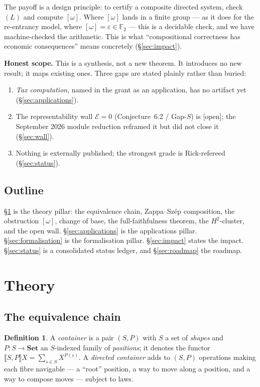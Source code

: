 \documentclass[11pt]{article}
\theoremstyle{plain}
\theoremstyle{definition}
\newtheorem{definition}[theorem]{Definition}
\theoremstyle{remark}
\newcommand{\Set}{\mathbf{Set}}
\newcommand{\omegacl}{[\omega]}
\newcommand{\HH}[1]{H^{#1}}
\newcommand{\grade}[1]{{\small\textsf{[#1]}}}
\newcommand{\gOpen}{\grade{open}}
\begin{document}
The payoff is a design principle: to certify a composite directed system, check $(L)$ and
compute $\omegacl$. Where $\omegacl$ lands in a finite group --- as it does for the
re-entrancy model, where $\omegacl = \varepsilon \in \mathbb{F}_2$ --- this is a decidable
check, and we have machine-checked the arithmetic. This is what ``compositional
correctness has economic consequences'' means concretely (\S\ref{sec:impact}).

\medskip
\noindent\textbf{Honest scope.} This is a synthesis, not a new theorem. It introduces no
new result; it maps existing ones. Three gaps are stated plainly rather than buried:
\begin{enumerate}[nosep,label=(\roman*)]
  \item \emph{Tax computation}, named in the grant as an application, has no artifact yet
    (\S\ref{sec:applications}).
  \item The representability wall $\mathcal{E}=0$ (Conjecture~6.2 / Gap-$S$) is
    \gOpen{}; the September 2026 module reduction reframed it but did not close it
    (\S\ref{sec:wall}).
  \item Nothing is externally published; the strongest grade is Rick-refereed
    (\S\ref{sec:status}).
\end{enumerate}

\subsection{Outline}
\S\ref{sec:theory} is the theory pillar: the equivalence chain, Zappa--Sz\'ep
composition, the obstruction $\omegacl$, change of base, the full-faithfulness theorem,
the $\HH{2}$-cluster, and the open wall. \S\ref{sec:applications} is the applications
pillar. \S\ref{sec:formalisation} is the formalisation pillar. \S\ref{sec:impact} states
the impact. \S\ref{sec:status} is a consolidated status ledger, and \S\ref{sec:roadmap}
the roadmap.

\section{Theory}\label{sec:theory}

\subsection{The equivalence chain}\label{sec:chain}

\begin{definition}
A \emph{container} is a pair $(S, P)$ with $S$ a set of \emph{shapes} and
$P \colon S \to \Set$ an $S$-indexed family of \emph{positions}; it denotes the functor
$\llbracket S,P\rrbracket X = \sum_{s\in S} X^{P(s)}$. A \emph{directed container} adds
to $(S,P)$ operations making each fibre navigable --- a ``root'' position, a way to move
along a position, and a way to compose moves --- subject to laws.
\end{definition}
\end{document}
